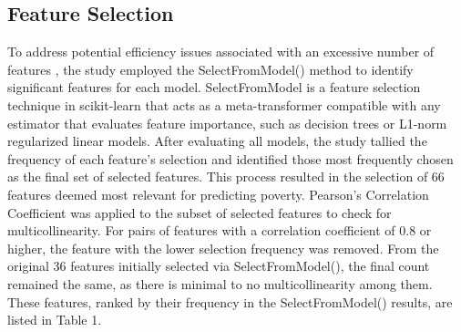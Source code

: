 \documentclass[a4paper,fleqn]{cas-sc}
\begin{document}
\subsection{Feature Selection}
To address potential efficiency issues associated with an excessive number of features \citep{li2017feature}, the study employed the SelectFromModel() method to identify significant features for each model. SelectFromModel is a feature selection technique in scikit-learn that acts as a meta-transformer compatible with any estimator that evaluates feature importance, such as decision trees or L1-norm regularized linear models. After evaluating all models, the study tallied the frequency of each feature's selection and identified those most frequently chosen as the final set of selected features. This process resulted in the selection of 66 features deemed most relevant for predicting poverty. Pearson’s Correlation Coefficient was applied to the subset of selected features to check for multicollinearity. For pairs of features with a correlation coefficient of 0.8 or higher, the feature with the lower selection frequency was removed. From the original 36 features initially selected via SelectFromModel(), the final count remained the same, as there is minimal to no multicollinearity among them. These features, ranked by their frequency in the SelectFromModel() results, are listed in Table 1.
\end{document}
